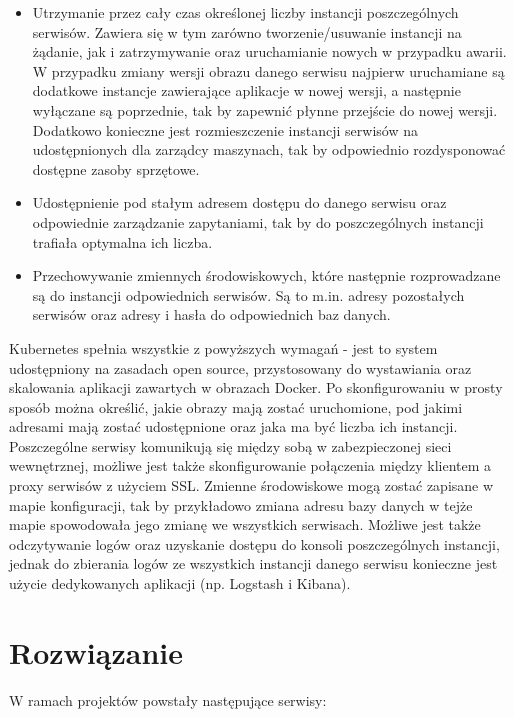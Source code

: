 \documentclass[11pt,a4paper,twoside]{article}
\begin{document}
\begin{itemize}
\item Utrzymanie przez cały czas określonej liczby instancji poszczególnych serwisów. Zawiera się w tym zarówno tworzenie/usuwanie instancji na żądanie, jak i zatrzymywanie oraz uruchamianie nowych w przypadku awarii. W przypadku zmiany wersji obrazu danego serwisu najpierw uruchamiane są dodatkowe instancje zawierające aplikacje w nowej wersji, a następnie wyłączane są poprzednie, tak by zapewnić płynne przejście do nowej wersji. Dodatkowo konieczne jest rozmieszczenie instancji serwisów na udostępnionych dla zarządcy maszynach, tak by odpowiednio rozdysponować dostępne zasoby sprzętowe.
\item Udostępnienie pod stałym adresem dostępu do danego serwisu oraz odpowiednie zarządzanie zapytaniami, tak by do poszczególnych instancji trafiała optymalna ich liczba.
\item Przechowywanie zmiennych środowiskowych, które następnie rozprowadzane są do instancji odpowiednich serwisów. Są to m.in. adresy pozostałych serwisów oraz adresy i hasła do odpowiednich baz danych.
\end{itemize}

Kubernetes spełnia wszystkie z powyższych wymagań - jest to system udostępniony na zasadach open source, przystosowany do wystawiania oraz skalowania aplikacji zawartych w obrazach Docker. Po skonfigurowaniu w prosty sposób można określić, jakie obrazy mają zostać uruchomione, pod jakimi adresami mają zostać udostępnione oraz jaka ma być liczba ich instancji. Poszczególne serwisy komunikują się między sobą w zabezpieczonej sieci wewnętrznej, możliwe jest także skonfigurowanie połączenia między klientem a proxy serwisów z użyciem SSL. Zmienne środowiskowe mogą zostać zapisane w mapie konfiguracji, tak by przykładowo zmiana adresu bazy danych w tejże mapie spowodowała jego zmianę we wszystkich serwisach. Możliwe jest także odczytywanie logów oraz uzyskanie dostępu do konsoli poszczególnych instancji, jednak do zbierania logów ze wszystkich instancji danego serwisu konieczne jest użycie dedykowanych aplikacji (np. Logstash i Kibana).

\section{Rozwiązanie}
W ramach projektów powstały następujące serwisy:
\end{document}
